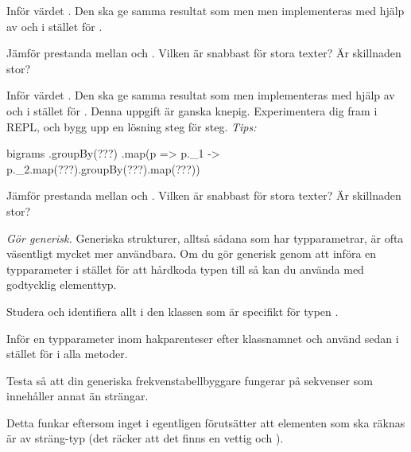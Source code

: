 \Subtask Inför värdet . Den ska ge samma resultat som  men men implementeras med hjälp av  och  i stället för .

\Subtask\Uberkurs Jämför prestanda mellan  och . Vilken är snabbast för stora texter? Är skillnaden stor?

\Subtask Inför värdet . Den ska ge samma resultat som  men implementeras med hjälp av  och  i stället för .
Denna uppgift är ganska knepig. Experimentera dig fram i REPL, och bygg upp en lösning steg för steg. \emph{Tips:}
\begin{Code}
bigrams
  .groupBy(???)
  .map(p => p._1 -> p._2.map(???).groupBy(???).map(???))
\end{Code}

\Subtask\Uberkurs Jämför prestanda mellan  och . Vilken är snabbast för stora texter? Är skillnaden stor?

\Task \emph{Gör  generisk.} Generiska strukturer, alltså sådana som har typparametrar, är ofta väsentligt mycket mer användbara. Om du gör  generisk genom att införa en typparameter i stället för att hårdkoda typen till  så kan du använda  med godtycklig elementtyp. 

\Subtask Studera  och identifiera allt i den klassen som är specifikt för typen .

\Subtask Inför en typparameter  inom hakparenteser efter klassnamnet och använd sedan  i stället för  i alla metoder.

\Subtask Testa så att din generiska frekvenstabellbyggare fungerar på sekvenser som innehåller annat än strängar.

Detta funkar eftersom inget i  egentligen förutsätter att elementen som ska räknas är av sträng-typ (det räcker att det finns en vettig  och ).

